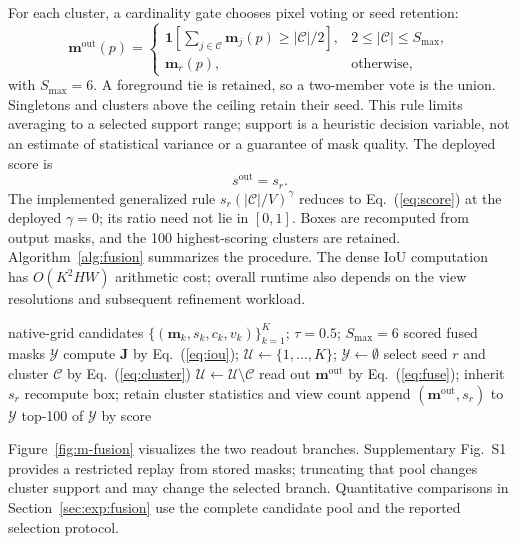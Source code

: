 For each cluster, a cardinality gate chooses pixel voting or seed retention:
\begin{equation}\label{eq:fuse}
\mathbf{m}^{\mathrm{out}}(p)=
\begin{cases}
\mathbf{1}\!\left[\sum_{j\in\mathcal{C}}\mathbf{m}_j(p)\ge|\mathcal{C}|/2\right],
&2\le|\mathcal{C}|\le S_{\max},\\[5pt]
\mathbf{m}_r(p),&\text{otherwise},
\end{cases}
\end{equation}
with $S_{\max}=6$. A foreground tie is retained, so a two-member vote is the union. Singletons and clusters above the ceiling retain their seed. This rule limits averaging to a selected support range; support is a heuristic decision variable, not an estimate of statistical variance or a guarantee of mask quality. The deployed score is
\begin{equation}\label{eq:score}
s^{\mathrm{out}}=s_r.
\end{equation}
The implemented generalized rule $s_r(|\mathcal{C}|/V)^\gamma$ reduces to Eq.~(\ref{eq:score}) at the deployed $\gamma=0$; its ratio need not lie in $[0,1]$. Boxes are recomputed from output masks, and the 100 highest-scoring clusters are retained. Algorithm~\ref{alg:fusion} summarizes the procedure. The dense IoU computation has $O(K^2HW)$ arithmetic cost; overall runtime also depends on the view resolutions and subsequent refinement workload.

\begin{algorithm}[!t]
\caption{Cluster-Support-Gated Mask Fusion}
\label{alg:fusion}
\begin{algorithmic}[1]
\REQUIRE native-grid candidates $\{(\mathbf{m}_k,s_k,c_k,v_k)\}_{k=1}^{K}$; $\tau=0.5$; $S_{\max}=6$
\ENSURE scored fused masks $\mathcal{Y}$
\STATE compute $\mathbf{J}$ by Eq.~(\ref{eq:iou}); $\mathcal{U}\leftarrow\{1,\ldots,K\}$; $\mathcal{Y}\leftarrow\emptyset$
  \STATE select seed $r$ and cluster $\mathcal{C}$ by Eq.~(\ref{eq:cluster})
  \STATE $\mathcal{U}\leftarrow\mathcal{U}\setminus\mathcal{C}$
  \STATE read out $\mathbf{m}^{\mathrm{out}}$ by Eq.~(\ref{eq:fuse}); inherit $s_r$
  \STATE recompute box; retain cluster statistics and view count
  \STATE append $(\mathbf{m}^{\mathrm{out}},s_r)$ to $\mathcal{Y}$
\ENDWHILE
\RETURN top-100 of $\mathcal{Y}$ by score
\end{algorithmic}
\end{algorithm}

Figure~\ref{fig:m-fusion} visualizes the two readout branches. Supplementary Fig.~S1 provides a restricted replay from stored masks; truncating that pool changes cluster support and may change the selected branch. Quantitative comparisons in Section~\ref{sec:exp:fusion} use the complete candidate pool and the reported selection protocol.

